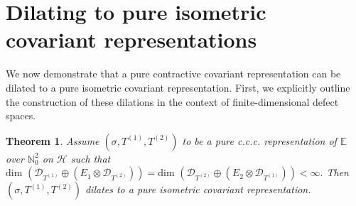 \documentclass[12pt]{amsart}
\numberwithin{equation}{section}
\theoremstyle{plain}
\newtheorem{theorem}{Theorem}[section]
\newcommand{\be}{\mathbb E}
\newcommand{\ot}{\otimes}
\begin{document}
\section{Dilating to pure isometric covariant representations}
We now demonstrate that a pure contractive covariant representation can be dilated to a pure isometric covariant representation. First, we explicitly outline the construction of these dilations in the context of finite-dimensional defect spaces.
	\begin{theorem}\label{JJ3}
	Assume $(\sigma, T^{(1)}, T^{(2)})$ to be a pure c.c.c. representation  of $\be$ over $\mathbb N^2_0$ on $\mathcal H$ such that $\mbox{dim~} (\mathcal{D}_{T^{(1)}} \oplus (E_1 \ot\mathcal{D}_{ T^{(2)}}))=\mbox{dim~} (\mathcal{D}_{ T^{(2)}}\oplus (E_2\ot \mathcal{D}_{ T^{(1)}}))< \infty.$ Then $(\sigma, T^{(1)}, T^{(2)})$ dilates to a pure isometric covariant representation.
\end{theorem}
\end{document}
